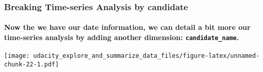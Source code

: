\documentclass[]{article}
\let\oldparagraph\paragraph
\renewcommand{\paragraph}[1]{\oldparagraph{#1}\mbox{}}
\begin{document}
\subsubsection{Breaking Time-series Analysis by
candidate}\label{breaking-time-series-analysis-by-candidate}

\paragraph{\texorpdfstring{Now the we have our date information, we can
detail a bit more our time-series analysis by adding another dimension:
\texttt{candidate\_name}.}{Now the we have our date information, we can detail a bit more our time-series analysis by adding another dimension: candidate\_name.}}\label{now-the-we-have-our-date-information-we-can-detail-a-bit-more-our-time-series-analysis-by-adding-another-dimension-candidate_name.}

\texttt{[image: udacity\_explore\_and\_summarize\_data\_files/figure-latex/unnamed-chunk-22-1.pdf]}
\end{document}
